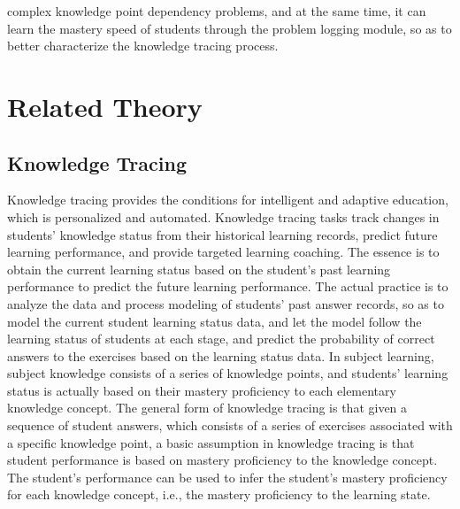 complex knowledge point dependency problems, and at the same time, it can learn the mastery speed of students through the problem logging module, so as to better characterize the knowledge tracing process.

\section{Related Theory}
\subsection{Knowledge Tracing}



Knowledge tracing provides the conditions for intelligent and adaptive education, which is personalized and automated. Knowledge tracing tasks track changes in students' knowledge status from their historical learning records, predict future learning performance, and provide targeted learning coaching. The essence is to obtain the current learning status based on the student's past learning performance to predict the future learning performance. The actual practice is to analyze the data and process modeling of students' past answer records, so as to model the current student learning status data, and let the model follow the learning status of students at each stage, and predict the probability of correct answers to the exercises based on the learning status data. In subject learning, subject knowledge consists of a series of knowledge points, and students' learning status is actually based on their mastery proficiency to each elementary knowledge concept. The general form of knowledge tracing is that given a sequence of student answers, which consists of a series of exercises associated with a specific knowledge point, a basic assumption in knowledge tracing is that student performance is based on mastery proficiency to the knowledge concept. The student's performance can be used to infer the student's mastery proficiency for each knowledge concept, i.e., the mastery proficiency to the learning state.

